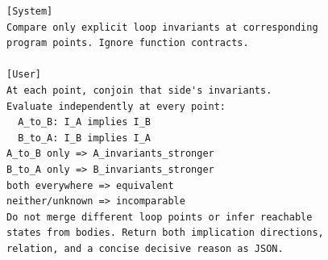 \begin{minipage}[t]{\columnwidth}
\begin{tcolorbox}[promptboxcompact, title={\textcolor{white}{Loop-invariant judge}}, width=\linewidth]
\begin{lstlisting}[style=PromptInnerCompact]
[System]
Compare only explicit loop invariants at corresponding
program points. Ignore function contracts.

[User]
At each point, conjoin that side's invariants.
Evaluate independently at every point:
  A_to_B: I_A implies I_B
  B_to_A: I_B implies I_A
A_to_B only => A_invariants_stronger
B_to_A only => B_invariants_stronger
both everywhere => equivalent
neither/unknown => incomparable
Do not merge different loop points or infer reachable
states from bodies. Return both implication directions,
relation, and a concise decisive reason as JSON.
\end{lstlisting}
\end{tcolorbox}
\end{minipage}
\begin{figure}[H]
\caption{}
\label{fig:prompt-judge}
\end{figure}

\subsection{}
\label{app:strength-results}


